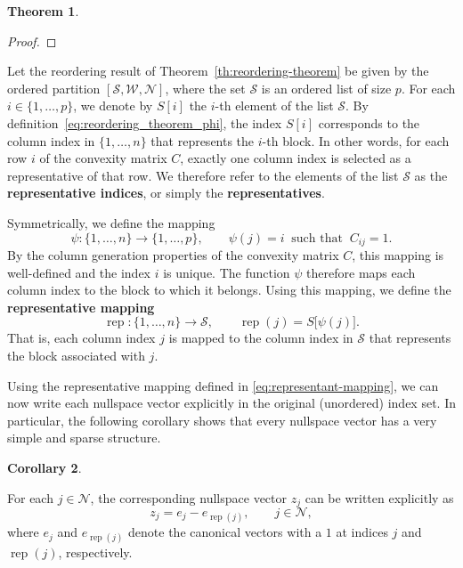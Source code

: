 \documentclass{book}
\theoremstyle{definition}
\newtheorem{theorem}{Theorem}[section]
\newtheorem{cor}[theorem]{Corollary}
\numberwithin{algorithm_}{chapter}
\begin{document}
{\begin{theorem}
\begin{proof}
\end{proof}
\end{theorem}

\medskip

Let the reordering result of Theorem~\ref{th:reordering-theorem} be given by the ordered partition $[\mathcal{S}, \mathcal{W}, \mathcal{N}]$,
where the set \(\mathcal{S}\) is an ordered list of size \(p\).  
For each \(i \in \{1, \ldots, p\}\), we denote by $S[i]$ the \(i\)-th element of the list \(\mathcal{S}\).  
By definition~\eqref{eq:reordering_theorem_phi}, the index \(S[i]\) corresponds to the column index in \(\{1, \ldots, n\}\) that represents the \(i\)-th block. In other words, for each row \(i\) of the convexity matrix \(C\), exactly one column index is selected as a representative of that row.  
We therefore refer to the elements of the list \(\mathcal{S}\) as the \textbf{representative indices}, or simply the \textbf{representatives}.

\bigskip

Symmetrically, we define the mapping
\begin{equation}
\label{eq:psi-mapping}
\psi : \{1, \ldots, n\} \to \{1, \ldots, p\},
\qquad
\psi(j) = i
\;\; \text{such that} \;\;
C_{ij} = 1.
\end{equation}
By the column generation properties of the convexity matrix \(C\), this mapping is well-defined and the index \(i\) is unique. The function \(\psi\) therefore maps each column index to the block to which it belongs. Using this mapping, we define the \textbf{representative mapping}
\begin{equation}
\label{eq:representant-mapping}
\operatorname{rep} : \{1, \ldots, n\} \to \mathcal{S},
\qquad
\operatorname{rep}(j) = S\bigl[\psi(j)\bigr].
\end{equation}
That is, each column index \(j\) is mapped to the column index in \(\mathcal{S}\) that represents the block associated with \(j\).

\bigskip

Using the representative mapping defined in \eqref{eq:representant-mapping}, we can now write each nullspace vector explicitly in the original (unordered) index set. In particular, the following corollary shows that every nullspace vector has a very simple and sparse structure.

\begin{cor}
\label{cor:explicit-nullvectors}

For each \(j \in \mathcal{N}\), the corresponding nullspace vector \(z_j\) can be written explicitly as
\begin{equation}
\label{eq:explicit-nullvector}
z_j
=
e_j
-
e_{\operatorname{rep}(j)},
\qquad
j \in \mathcal{N},
\end{equation}
where \(e_j\) and \(e_{\operatorname{rep}(j)}\) denote the canonical vectors with a \(1\) at indices \(j\) and \(\operatorname{rep}(j)\), respectively.


\end{cor}}
\end{document}
